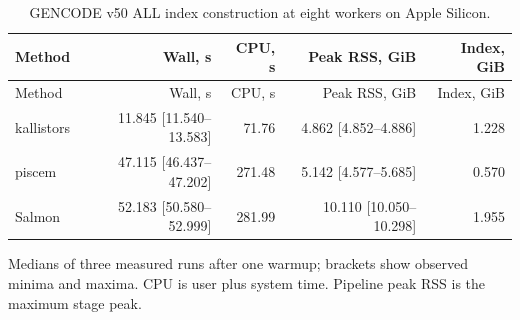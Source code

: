 \begingroup
\small
\setlength{\tabcolsep}{4pt}
\begin{longtable}{@{}lrrrr@{}}
\caption{GENCODE v50 ALL index construction at eight workers on Apple Silicon.}\label{tab:paper-index}\\
\toprule
Method & Wall, s & CPU, s & Peak RSS, GiB & Index, GiB \\
\midrule
\endfirsthead
\toprule
Method & Wall, s & CPU, s & Peak RSS, GiB & Index, GiB \\
\midrule
\endhead
\bottomrule
\endfoot
kallistors & 11.845 [11.540--13.583] & 71.76 & 4.862 [4.852--4.886] & 1.228 \\
piscem & 47.115 [46.437--47.202] & 271.48 & 5.142 [4.577--5.685] & 0.570 \\
Salmon & 52.183 [50.580--52.999] & 281.99 & 10.110 [10.050--10.298] & 1.955 \\
\end{longtable}
\noindent\footnotesize Medians of three measured runs after one warmup; brackets show observed minima and maxima. CPU is user plus system time. Pipeline peak RSS is the maximum stage peak.
\endgroup
